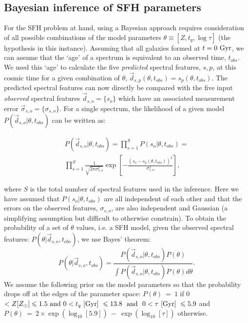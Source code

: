 \documentclass[useAMS,usenatbib]{mn2e}
\begin{document}
\subsection{Bayesian inference of SFH parameters}\label{sec:emcee}

For the SFH problem at hand, using a Bayesian approach requires consideration of all possible combinations of the model parameters $\theta \equiv [Z, t_{q}, \log \tau]$ (the hypothesis in this instance). Assuming that all galaxies formed at $t=0~\rm{Gyr}$, we can assume that the `age' of a spectrum is equivalent to an observed time, $t_{obs}$. We used this  `age' to calculate the five \emph{predicted} spectral features, $s,p$, at this cosmic time for a given combination of $\theta$, $\vec{d}_{s,p}(\theta, t_{obs}) = {s_p(\theta, t_{obs})}$. The predicted spectral features can now directly be compared with the five input \emph{observed} spectral features $\vec{d}_{s, o} = \{s_o\}$ which have an associated measurement error $\vec{\sigma}_{s, o} = \{\sigma_{s, o}\}$. For a single spectrum, the likelihood of a given model $P(\vec{d}_{s, o}|\theta, t_{obs})$ can be written as:



\begin{multline}\label{like}
P(\vec{d}_{s, o}|\theta, t_{obs}) = \prod_{s=1}^{S} P(s_{o}|\theta, t_{obs}) = \\ \prod_{s=1}^{S} \frac{1}{\sqrt{2\pi\sigma_{s,o}^2}} \exp{\left[ - \frac{(s_{o} - s_{p}(\theta, t_{obs}))^2}{\sigma_{s, o}^2} \right]},
\end{multline}

where $S$ is the total number of spectral features used in the inference. Here we have assumed that $P(s_{o}|\theta, t_{obs})$ are all independent of each other and that the errors on the observed features, $\sigma_{s, o}$, are also independent and Gaussian (a simplifying assumption but difficult to otherwise constrain). To obtain the probability of a set of $\theta$ values, i.e. a SFH model, given the observed spectral features: $P(\theta|\vec{d}_{s,o}, t_{obs})$, we use Bayes' theorem:
 \begin{equation}\label{eq:bayes}
P(\theta|\vec{d}_{s,o}, t_{obs}) = \frac{P(\vec{d}_{s,o}|\theta, t_{obs})P(\theta)}{\int P(\vec{d}_{s,o} |\theta, t_{obs})P(\theta) d\theta}.
\end{equation}
We assume the following prior on the model parameters so that the probability drops off at the edges of the parameter space: ${P(\theta)~=~1}$ if 0 $< Z [Z_{\odot}] \leq 1.5 \text{ and } 0 < t_q ~\rm{[Gyr]}~ \leq 13.8 ~ \text{ and } ~ 0 < \tau  ~\rm{[Gyr]}~ \leq 5.9$ and ${P(\theta)~=~2\times\exp\left(\log_{10}[5.9]\right)~-~\exp\left(\log_{10}[\tau]\right)}$ otherwise.
\end{document}

